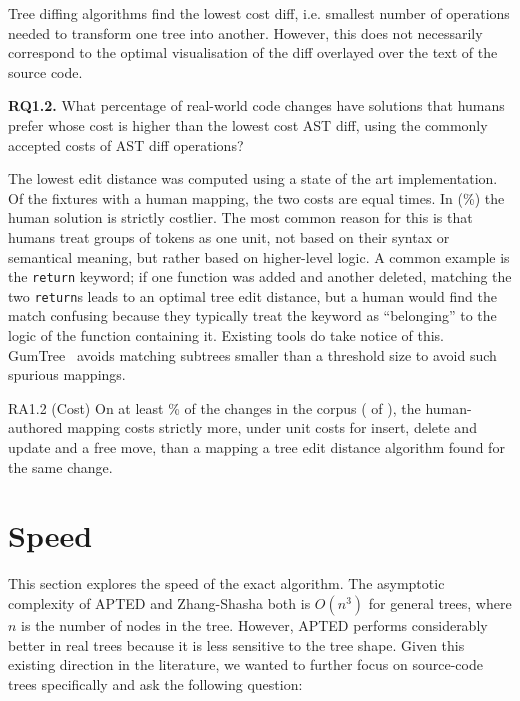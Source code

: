 \documentclass[sigconf]{acmart}
\begin{document}
Tree diffing algorithms find the lowest cost diff, i.e. smallest number of operations needed to
transform one tree into another. However, this does not necessarily correspond to the optimal
visualisation of the diff overlayed over the text of the source code.

\textbf{RQ1.2.} What percentage of real-world code changes have solutions that humans prefer
whose cost is higher than the lowest cost AST diff, using the commonly accepted costs of AST
diff operations?

The lowest edit distance was computed using a state of the art implementation. Of the \CostScored{} fixtures with a human mapping, the
two costs are equal \CostTieFixtures{} times. In \CostHumanHigherFixtures{} (\CostHumanHigherPct{}\%) the human solution is strictly costlier. The most common reason for this is that humans treat groups of tokens
as one unit, not based on their syntax or semantical meaning, but rather based on higher-level logic.
A common example is the \texttt{return} keyword; if one function was added and another deleted,
matching the two \texttt{return}s leads to an optimal tree edit distance, but a human would find the match confusing because they typically
treat the keyword as ``belonging'' to the logic of the function containing it. Existing tools do take
notice of this. GumTree~\cite{gumtreediff-2014} avoids matching subtrees smaller than a
threshold size to avoid such spurious mappings.

\begin{resultbox}{RA1.2 (Cost)}
  On at least \CostHumanHigherPct{}\% of the changes in the corpus (\CostHumanHigherFixtures{} of
  \CostScored{}), the human-authored mapping costs strictly more, under unit costs for insert,
  delete and update and a free move, than a mapping a tree edit distance algorithm found for the
  same change.
\end{resultbox}

\section{Speed}
\label{sec:speed}

This section explores the speed of the exact algorithm.
The asymptotic complexity of APTED and Zhang-Shasha both is $O(n^3)$ for general trees, where $n$
is the number of nodes in the tree. However, APTED performs considerably better in real trees
because it is less sensitive to the tree shape. Given this existing direction in the literature,
we wanted to further focus on source-code trees specifically and ask the following question:
\end{document}
